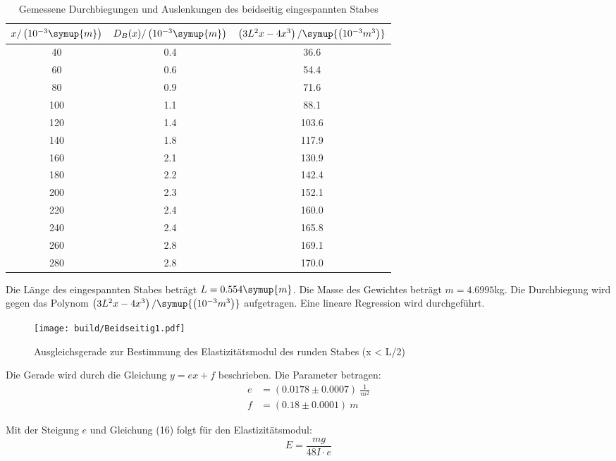 \begin{table}[H]
  \centering
  \caption{Gemessene Durchbiegungen und Auslenkungen des beidseitig eingespannten Stabes}
  \label{tab:beidseitig}
  \begin{tabular}{c c c}
    \toprule
    $x/\left(10^{-3}\symup{m}\right)$ & $D_{B}(x)/\left(10^{-3}\symup{m}\right)$ & $\left(3L^2x-4x^3\right)/\symup{\left(10^{-3}m^3\right)}$ \\
    \midrule
     40 & 0.4 &  36.6 \\
     60 & 0.6 &  54.4 \\
     80 & 0.9 &  71.6 \\
    100 & 1.1 &  88.1 \\
    120 & 1.4 & 103.6 \\
    140 & 1.8 & 117.9 \\
    160 & 2.1 & 130.9 \\
    180 & 2.2 & 142.4 \\
    200 & 2.3 & 152.1 \\
    220 & 2.4 & 160.0 \\
    240 & 2.4 & 165.8 \\
    260 & 2.8 & 169.1 \\
    280 & 2.8 & 170.0 \\
    \bottomrule
  \end{tabular}
\end{table}

Die Länge des eingespannten Stabes beträgt $L = 0.554 \symup{m}$. Die Masse des
Gewichtes beträgt $m = 4.6995$kg.
Die Durchbiegung wird gegen das Polynom $\left(3L^2x-4x^3\right)/\symup{\left(10^{-3}m^3\right)}$ aufgetragen. Eine
lineare Regression wird durchgeführt.

\begin{figure}[H]
  \centering
  \texttt{[image: build/Beidseitig1.pdf]}
  \caption{Ausgleichsgerade zur Bestimmung des Elastizitätsmodul des runden Stabes (x < L/2)}
  \label{fig:Elastizitätsmodul des runden Stabes}
\end{figure}

Die Gerade wird durch die Gleichung $y = ex + f$ beschrieben. Die Parameter betragen:
\begin{align*}
  e &= (0.0178 \pm 0.0007) \: \frac{1}{m^2} \\
  f &= (0.18  \pm 0.0001) \: m
\end{align*}

Mit der Steigung $e$ und Gleichung (16) folgt für den Elastizitätsmodul:
\begin{equation}
  E = \frac{mg}{48I \cdot e}
\end{equation}

